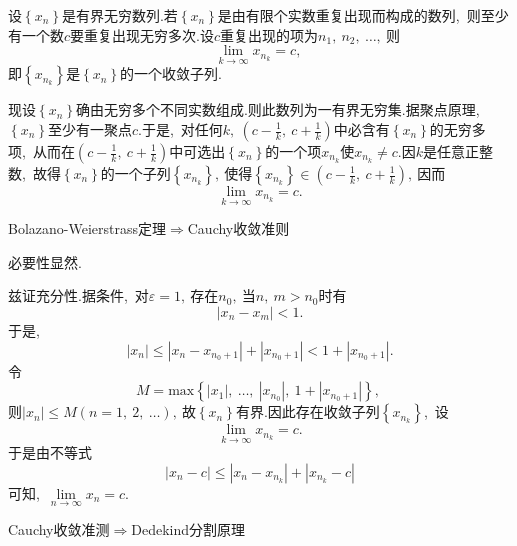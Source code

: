 \begin{solution}
	设$\left\{x_n\right\}$是有界无穷数列.若$\left\{x_n\right\}$是由有限个实数重复出现而构成的数列,\ 则至少有一个数$c$要重复出现无穷多次.设$c$重复出现的项为$n_1,\ n_2,\ \dots,\ $则
	$$\lim\limits_{k\rightarrow\infty}x_{n_k}=c,\ $$
	即$\left\{x_{n_k}\right\}$是$\left\{x_n\right\}$的一个收敛子列.
	
	现设$\left\{x_n\right\}$确由无穷多个不同实数组成.则此数列为一有界无穷集.据聚点原理,\ $\left\{x_n\right\}$至少有一聚点$c$.于是,\ 对任何$k,\ \left(c-\frac{1}{k},\ c+\frac{1}{k}\right)$中必含有$\left\{x_n\right\}$的无穷多项,\ 从而在$\left(c-\frac{1}{k},\ c+\frac{1}{k}\right)$中可选出$\left\{x_n\right\}$的一个项$x_{n_k}$使$x_{n_k}\neq c.$因$k$是任意正整数,\ 故得$\left\{x_n\right\}$的一个子列$\left\{x_{n_k}\right\},\ $使得$\left\{x_{n_k}\right\}\in \left(c-\frac{1}{k},\ c+\frac{1}{k}\right),\ $因而
	$$\lim\limits_{k\rightarrow\infty}x_{n_k}=c.$$ 
\end{solution}
\newpage
\begin{problem}
	Bolazano-Weierstrass定理$\Rightarrow$Cauchy收敛准则
\end{problem}

\begin{solution}
	必要性显然.
	
	兹证充分性.据条件,\ 对$\varepsilon=1,\ $存在$n_0,\ $当$n,\ m>n_0$时有
	$$|x_n-x_m|<1.$$
	于是,\ 
	$$|x_n|\le|x_n-x_{n_0+1}|+|x_{n_0+1}|<1+|x_{n_0+1}|.$$
	令
	$$M=\text{max}\left\{|x_1|,\ \dots,\ |x_{n_0}|,\ 1+|x_{n_0+1}|\right\},\ $$
	则$|x_n|\le M\left(n=1,\ 2,\ \dots\right),\ $故$\left\{x_n\right\}$有界.因此存在收敛子列$\left\{x_{n_k}\right\}$,\ 设
	$$\lim\limits_{k\rightarrow\infty}x_{n_k}=c.$$
	于是由不等式
	$$|x_n-c|\le|x_n-x_{n_k}|+|x_{n_k}-c|$$
	可知,\ $\lim\limits_{n\rightarrow \infty}x_n=c.$
\end{solution}
\newpage
\begin{problem}
	Cauchy收敛准测$\Rightarrow$Dedekind分割原理
\end{problem}

